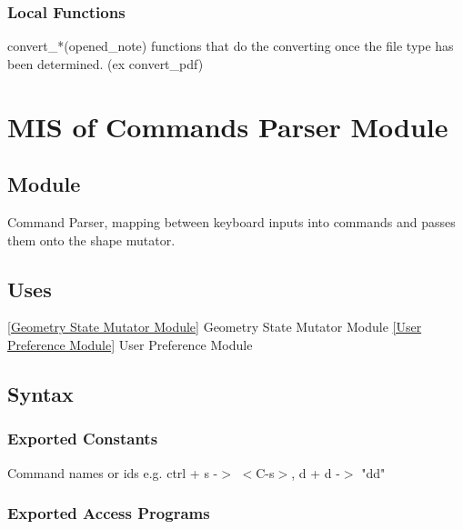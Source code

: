 \documentclass[12pt, titlepage]{article}
\begin{document}
\subsubsection{Local Functions}

convert\_*(opened\_note) functions that do the converting once the file type has been determined. (ex convert\_pdf)

\newpage
\section{MIS of {Commands Parser Module}} \label{Commands Parser Module}
%
%

\subsection{Module}

Command Parser, mapping between keyboard inputs into commands and passes them onto the shape mutator.

\subsection{Uses}
\ref{Geometry State Mutator Module} {Geometry State Mutator Module}
\ref{User Preference Module} {User Preference Module}
\subsection{Syntax}

\subsubsection{Exported Constants}

Command names or ids e.g. ctrl + s -$>$ $<$C-s$>$, d + d -$>$ "dd"

\subsubsection{Exported Access Programs}
\end{document}
